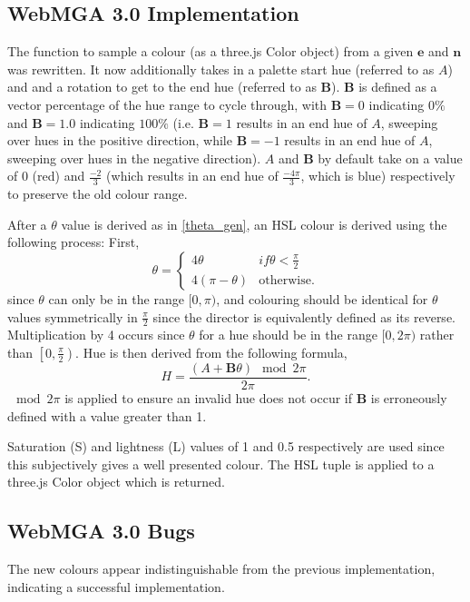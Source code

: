 \subsection{WebMGA 3.0 Implementation}
\label{colour_dir_impl}
The function to sample a colour (as a three.js Color object) from a given $\mathbf{e}$ and $\mathbf{n}$ was rewritten. It now additionally takes in a palette start hue (referred to as $A$) and and a rotation to get to the end hue (referred to as $\mathbf{B}$). $\mathbf{B}$ is defined as a vector percentage of the hue range to cycle through, with $\mathbf{B}=0$ indicating $0\%$ and $\mathbf{B}=1.0$ indicating $100\%$ (i.e. $\mathbf{B}=1$ results in an end hue of $A$, sweeping over hues in the positive direction, while $\mathbf{B}=-1$ results in an end hue of $A$, sweeping over hues in the negative direction). $A$ and $\mathbf{B}$ by default take on a value of $0$ (red) and $\frac{-2}{3}$ (which results in an end hue of $\frac{-4\pi}{3}$, which is blue) respectively to preserve the old colour range.

After a $\theta$ value is derived as in \cref{theta_gen}, an HSL colour is derived using the following process: First,
\begin{equation}
\theta=\begin{cases}
  4\theta &{if } \theta<\frac{\pi}{2}\\
  4(\pi-\theta)&\text{otherwise.}
\end{cases}
\end{equation}
since $\theta$ can only be in the range $[0, \pi)$, and colouring should be identical for $\theta$ values symmetrically in $\frac{\pi}{2}$ since the director is equivalently defined as its reverse. Multiplication by 4 occurs since $\theta$ for a hue should be in the range $[0, 2\pi)$ rather than $\left[0, \frac{\pi}{2}\right)$. Hue is then derived from the following formula,
\begin{equation}
H=\frac{(A+\mathbf{B}\theta) \mod 2\pi}{2\pi}.
\end{equation}
$\mod 2\pi$ is applied to ensure an invalid hue does not occur if $\mathbf{B}$ is erroneously defined with a value greater than 1.

Saturation (S) and lightness (L) values of 1 and 0.5 respectively are used since this subjectively gives a well presented colour. The HSL tuple is applied to a three.js Color object which is returned.

\subsection{WebMGA 3.0 Bugs}
The new colours appear indistinguishable from the previous implementation, indicating a successful implementation.
